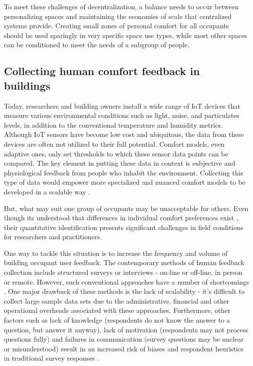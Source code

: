 \documentclass[]{interact}
\theoremstyle{plain}%
\theoremstyle{definition}
\theoremstyle{remark}
\begin{document}
To meet these challenges of decentralization, a balance needs to occur between personalizing spaces and maintaining the economies of scale that centralized systems provide. Creating small zones of personal comfort for all occupants should be used sparingly in very specific space use types, while most other spaces can be conditioned to meet the needs of a subgroup of people. 




\subsection{Collecting human comfort feedback in buildings}
Today, researchers and building owners install a wide range of IoT devices that measure various environmental conditions such as light, noise, and particulates levels, in addition to the conventional temperature and humidity metrics. 
Although IoT sensors have become low cost and ubiquitous, the data from these devices are often not utilized to their full potential. Comfort models, even adaptive ones, only set thresholds to which these sensor data points can be compared. The key element in putting these data in context is subjective and physiological feedback from people who inhabit the environment. Collecting this type of data would empower more specialized and nuanced comfort models to be developed in a scalable way \cite{ltpaper}.

But, what may suit one group of occupants may be unacceptable for others. Even though its understood that differences in individual comfort preferences exist \cite{WANG2018181}, their quantitative identification presents significant challenges in field conditions for researchers and practitioners.

One way to tackle this situation is to increase the frequency and volume of building occupant user feedback. The contemporary methods of human feedback collection include structured surveys or interviews - on-line or off-line, in person or remote. However, such conventional approaches have a number of shortcomings \cite{oecd}. One major drawback of these methods is the lack of scalability - it’s difficult to collect large sample data sets due to the administrative, financial and other operational overheads associated with these approaches. Furthermore, other factors such as lack of knowledge (respondents do not know the answer to a question, but answer it anyway), lack of motivation (respondents may not process questions fully) and failures in communication (survey questions may be unclear or misunderstood) result in an increased risk of biases and respondent heuristics in traditional survey responses \cite{bradburn2004asking}.
\end{document}
